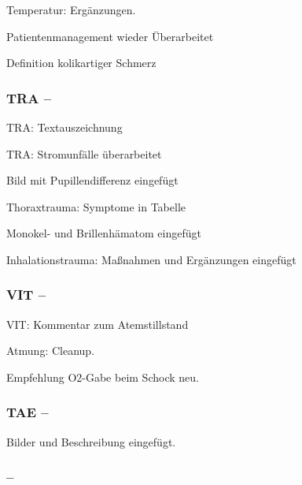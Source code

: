 \documentclass[ngerman,a4paper,fontsize=9pt,BCOR=0cm,DIV=11,headings=big,draft=no]{scrreprt}
\begin{document}
Temperatur: Ergänzungen.

Patientenmanagement wieder Überarbeitet

Definition kolikartiger Schmerz




\subsubsection{TRA -- }

TRA: Textauszeichnung

TRA: Stromunfälle
überarbeitet

Bild mit Pupillendifferenz eingefügt

Thoraxtrauma: Symptome in Tabelle

Monokel- und Brillenhämatom eingefügt

Inhalationstrauma: Maßnahmen und Ergänzungen
eingefügt


\subsubsection{VIT -- }

VIT: Kommentar zum
Atemstillstand

Atmung: Cleanup.

Empfehlung O2-Gabe beim Schock neu.

\subsubsection{TAE -- }

Bilder und Beschreibung eingefügt.


\subsubsection{ -- }
\end{document}
